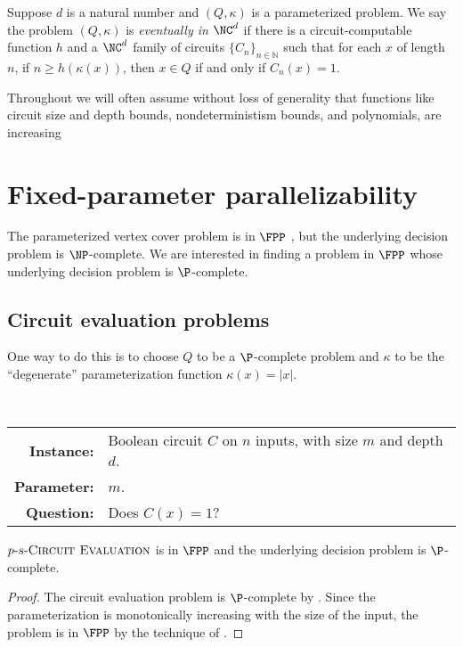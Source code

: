 \documentclass{article}
\newcommand{\dash}{\textnormal{-}}
\begin{document}
\begin{definition}
  Suppose $d$ is a natural number and $(Q, \kappa)$ is a parameterized problem.
  We say the problem $(Q, \kappa)$ is \emph{eventually in $\NC^d$} if there is a circuit-computable function $h$ and a $\NC^d$ family of circuits $\{C_n\}_{n \in \mathbb{N}}$ such that for each $x$ of length $n$, if $n \geq h(\kappa(x))$, then $x \in Q$ if and only if $C_n(x) = 1$.
\end{definition}

Throughout we will often assume without loss of generality that functions like circuit size and depth bounds, nondeterministism bounds, and polynomials, are increasing

\section{Fixed-parameter parallelizability}
\label{sec:pcompletefpp}

The parameterized vertex cover problem is in $\FPP$ \autocite{bst15}, but the underlying decision problem is $\NP$-complete.
We are interested in finding a problem in $\FPP$ whose underlying decision problem is $\P$-complete.

\subsection{Circuit evaluation problems}

One way to do this is to choose $Q$ to be a $\P$-complete problem and $\kappa$ to be the ``degenerate'' parameterization function $\kappa(x) = |x|$.

\begin{definition}[$p \dash s \dash \textsc{Circuit Evaluation}$]
  \mbox{} \\
  \begin{tabular}{r p{9.2cm}}
    \textbf{Instance:} & Boolean circuit $C$ on $n$ inputs, with size $m$ and depth $d$. \\
    \textbf{Parameter:} & $m$. \\
    \textbf{Question:} & Does $C(x) = 1$?
  \end{tabular}
\end{definition}

\begin{theorem}
  $p \dash s \dash \textsc{Circuit Evaluation}$ is in $\FPP$ and the underlying decision problem is $\P$-complete.
\end{theorem}
\begin{proof}
  The circuit evaluation problem is $\P$-complete by \autocite{ladner75}.
  Since the parameterization is monotonically increasing with the size of the input, the problem is in $\FPP$ by the technique of \autocite[Proposition~1.7]{fg06}.
\end{proof}
\end{document}
